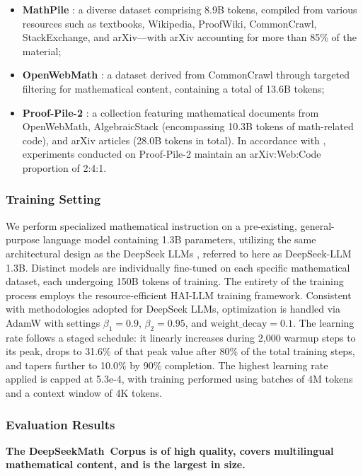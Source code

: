 \begin{itemize}[topsep=0pt]
\begin{itemize}[topsep=0pt]
    \item \textbf{MathPile} \citep{mathpile}: a diverse dataset comprising 8.9B tokens, compiled from various resources such as textbooks, Wikipedia, ProofWiki, CommonCrawl, StackExchange, and arXiv—with arXiv accounting for more than 85\% of the material;
    \item \textbf{OpenWebMath} \citep{openwebmath}: a dataset derived from CommonCrawl through targeted filtering for mathematical content, containing a total of 13.6B tokens;
    \item \textbf{Proof-Pile-2} \citep{llemma}: a collection featuring mathematical documents from OpenWebMath, AlgebraicStack (encompassing 10.3B tokens of math-related code), and arXiv articles (28.0B tokens in total). In accordance with \cite{llemma}, experiments conducted on Proof-Pile-2 maintain an arXiv:Web:Code proportion of 2:4:1.
\end{itemize}

\subsubsection{Training Setting}
\label{sec:quality-policy}
We perform specialized mathematical instruction on a pre-existing, general-purpose language model containing 1.3B parameters, utilizing the same architectural design as the DeepSeek LLMs \citep{deepseek-llm}, referred to here as DeepSeek-LLM 1.3B. Distinct models are individually fine-tuned on each specific mathematical dataset, each undergoing 150B tokens of training. The entirety of the training process employs the resource-efficient HAI-LLM \citep{haillm} training framework. Consistent with methodologies adopted for DeepSeek LLMs, optimization is handled via AdamW \citep{adamW} with settings $\beta_1=0.9$, $\beta_2=0.95$, and $\mathrm{weight\_decay}=0.1$. The learning rate follows a staged schedule: it linearly increases during 2,000 warmup steps to its peak, drops to 31.6\% of that peak value after 80\% of the total training steps, and tapers further to 10.0\% by 90\% completion. The highest learning rate applied is capped at 5.3e-4, with training performed using batches of 4M tokens and a context window of 4K tokens.

\subsubsection{Evaluation Results}

\textbf{The DeepSeekMath~Corpus is of high quality, covers multilingual mathematical content, and is the largest in size.}


\end{itemize}
